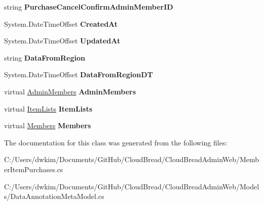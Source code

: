 \begin{DoxyCompactItemize}
\item 
string {\bfseries Purchase\+Cancel\+Confirm\+Admin\+Member\+ID}\hypertarget{a00141_a6af8fda338875e7f91f8148ae33b541e}{}\label{a00141_a6af8fda338875e7f91f8148ae33b541e}

\item 
System.\+Date\+Time\+Offset {\bfseries Created\+At}\hypertarget{a00141_a3002cc3fd385e66c1af34be46aac17ab}{}\label{a00141_a3002cc3fd385e66c1af34be46aac17ab}

\item 
System.\+Date\+Time\+Offset {\bfseries Updated\+At}\hypertarget{a00141_acb129567698793675f39f2683ab9a1cd}{}\label{a00141_acb129567698793675f39f2683ab9a1cd}

\item 
string {\bfseries Data\+From\+Region}\hypertarget{a00141_a6947e49c01075d995acd9550102355e8}{}\label{a00141_a6947e49c01075d995acd9550102355e8}

\item 
System.\+Date\+Time\+Offset {\bfseries Data\+From\+Region\+DT}\hypertarget{a00141_a60cc80d7c574eb9c846f3ca7b6868bf5}{}\label{a00141_a60cc80d7c574eb9c846f3ca7b6868bf5}

\item 
virtual \hyperlink{a00012}{Admin\+Members} {\bfseries Admin\+Members}\hypertarget{a00141_a3a758bf2025cd3415bc092cac4b805c2}{}\label{a00141_a3a758bf2025cd3415bc092cac4b805c2}

\item 
virtual \hyperlink{a00127}{Item\+Lists} {\bfseries Item\+Lists}\hypertarget{a00141_ab41b6e0a7143244983fa31859e286599}{}\label{a00141_ab41b6e0a7143244983fa31859e286599}

\item 
virtual \hyperlink{a00145}{Members} {\bfseries Members}\hypertarget{a00141_a5065e8de3829f0a180dffc344635fb8f}{}\label{a00141_a5065e8de3829f0a180dffc344635fb8f}

\end{DoxyCompactItemize}


The documentation for this class was generated from the following files\+:\begin{DoxyCompactItemize}
\item 
C\+:/\+Users/dwkim/\+Documents/\+Git\+Hub/\+Cloud\+Bread/\+Cloud\+Bread\+Admin\+Web/Member\+Item\+Purchases.\+cs\item 
C\+:/\+Users/dwkim/\+Documents/\+Git\+Hub/\+Cloud\+Bread/\+Cloud\+Bread\+Admin\+Web/\+Models/Data\+Annotation\+Meta\+Model.\+cs\end{DoxyCompactItemize}
